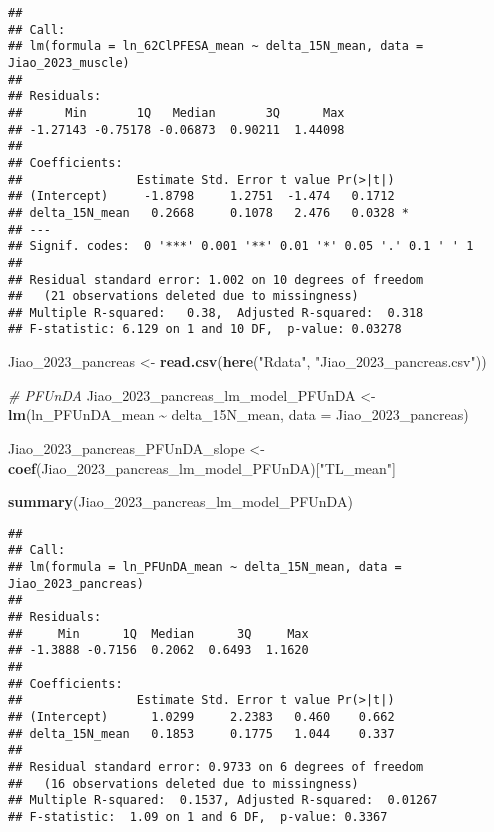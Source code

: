 \documentclass[
]{article}
\newenvironment{Shaded}{\begin{snugshade}}{\end{snugshade}}
\newcommand{\AttributeTok}[1]{\textcolor[rgb]{0.13,0.29,0.53}{#1}}
\newcommand{\CommentTok}[1]{\textcolor[rgb]{0.56,0.35,0.01}{\textit{#1}}}
\newcommand{\FunctionTok}[1]{\textcolor[rgb]{0.13,0.29,0.53}{\textbf{#1}}}
\newcommand{\NormalTok}[1]{#1}
\newcommand{\OtherTok}[1]{\textcolor[rgb]{0.56,0.35,0.01}{#1}}
\newcommand{\SpecialCharTok}[1]{\textcolor[rgb]{0.81,0.36,0.00}{\textbf{#1}}}
\newcommand{\StringTok}[1]{\textcolor[rgb]{0.31,0.60,0.02}{#1}}
\begin{document}
\begin{verbatim}
## 
## Call:
## lm(formula = ln_62ClPFESA_mean ~ delta_15N_mean, data = Jiao_2023_muscle)
## 
## Residuals:
##      Min       1Q   Median       3Q      Max 
## -1.27143 -0.75178 -0.06873  0.90211  1.44098 
## 
## Coefficients:
##                Estimate Std. Error t value Pr(>|t|)  
## (Intercept)     -1.8798     1.2751  -1.474   0.1712  
## delta_15N_mean   0.2668     0.1078   2.476   0.0328 *
## ---
## Signif. codes:  0 '***' 0.001 '**' 0.01 '*' 0.05 '.' 0.1 ' ' 1
## 
## Residual standard error: 1.002 on 10 degrees of freedom
##   (21 observations deleted due to missingness)
## Multiple R-squared:   0.38,  Adjusted R-squared:  0.318 
## F-statistic: 6.129 on 1 and 10 DF,  p-value: 0.03278
\end{verbatim}

\begin{Shaded}
\begin{Highlighting}[]
\NormalTok{Jiao\_2023\_pancreas }\OtherTok{\textless{}{-}} \FunctionTok{read.csv}\NormalTok{(}\FunctionTok{here}\NormalTok{(}\StringTok{"Rdata"}\NormalTok{, }\StringTok{"Jiao\_2023\_pancreas.csv"}\NormalTok{))}

\CommentTok{\# PFUnDA}
\NormalTok{Jiao\_2023\_pancreas\_lm\_model\_PFUnDA }\OtherTok{\textless{}{-}} \FunctionTok{lm}\NormalTok{(ln\_PFUnDA\_mean }\SpecialCharTok{\textasciitilde{}}\NormalTok{ delta\_15N\_mean,}
                                    \AttributeTok{data =}\NormalTok{ Jiao\_2023\_pancreas)}

\NormalTok{Jiao\_2023\_pancreas\_PFUnDA\_slope }\OtherTok{\textless{}{-}} \FunctionTok{coef}\NormalTok{(Jiao\_2023\_pancreas\_lm\_model\_PFUnDA)[}\StringTok{"TL\_mean"}\NormalTok{]}

\FunctionTok{summary}\NormalTok{(Jiao\_2023\_pancreas\_lm\_model\_PFUnDA)}
\end{Highlighting}
\end{Shaded}

\begin{verbatim}
## 
## Call:
## lm(formula = ln_PFUnDA_mean ~ delta_15N_mean, data = Jiao_2023_pancreas)
## 
## Residuals:
##     Min      1Q  Median      3Q     Max 
## -1.3888 -0.7156  0.2062  0.6493  1.1620 
## 
## Coefficients:
##                Estimate Std. Error t value Pr(>|t|)
## (Intercept)      1.0299     2.2383   0.460    0.662
## delta_15N_mean   0.1853     0.1775   1.044    0.337
## 
## Residual standard error: 0.9733 on 6 degrees of freedom
##   (16 observations deleted due to missingness)
## Multiple R-squared:  0.1537, Adjusted R-squared:  0.01267 
## F-statistic:  1.09 on 1 and 6 DF,  p-value: 0.3367
\end{verbatim}
\end{document}
